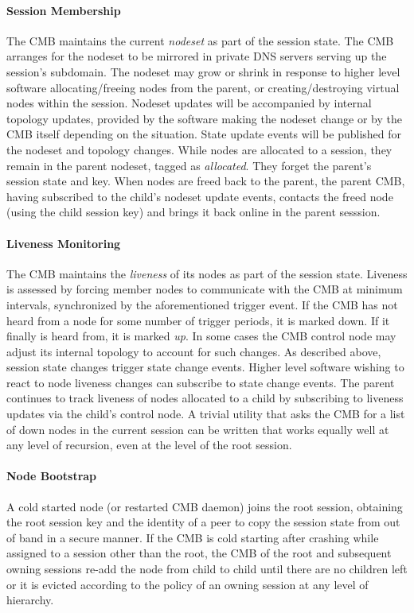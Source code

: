 \paragraph{Session Membership}
The CMB maintains the current {\em nodeset} as part of the session state.
The CMB arranges for the nodeset to be mirrored in private DNS servers
serving up the session's subdomain.
The nodeset may grow or shrink in response to higher level software
allocating/freeing nodes from the parent, or creating/destroying 
virtual nodes within the session.
Nodeset updates will be accompanied by internal topology updates, provided by
the software making the nodeset change or by the CMB itself depending
on the situation.
State update events will be published for the nodeset and topology changes.
While nodes are allocated to a session, they remain in the parent nodeset,
tagged as {\em allocated}.  They forget the parent's session state and key.
When nodes are freed back to the parent, the parent CMB, having subscribed
to the child's nodeset update events, contacts the freed node (using the
child session key) and brings it back online in the parent sesssion.  

\paragraph{Liveness Monitoring}
The CMB maintains the {\em liveness} of its nodes as part
of the session state.
Liveness is assessed by forcing member nodes to communicate with the CMB
at minimum intervals, synchronized by the aforementioned trigger event.
If the CMB has not heard from a node for some number
of trigger periods, it is marked down.
If it finally is heard from, it is marked {\em up}.
In some cases the CMB control node may adjust its internal topology
to account for such changes.
As described above, session state changes trigger state change events.
Higher level software wishing to react to node liveness changes can
subscribe to state change events.
The parent continues to track liveness of nodes allocated to a child by
subscribing to liveness updates via the child's control node.  A trivial
utility that asks the CMB for a list of down nodes in the current session
can be written that works equally well at any level of recursion,
even at the level of the root session.

\paragraph{Node Bootstrap}
A cold started node (or restarted CMB daemon) joins the root session,
obtaining the root session key and the identity of a peer to copy the
session state from out of band in a secure manner.
If the CMB is cold starting after crashing while assigned to
a session other than the root, the CMB of the root and subsequent owning
sessions re-add the node from child to child until there are no children
left or it is evicted according to the policy of an owning session
at any level of hierarchy.

